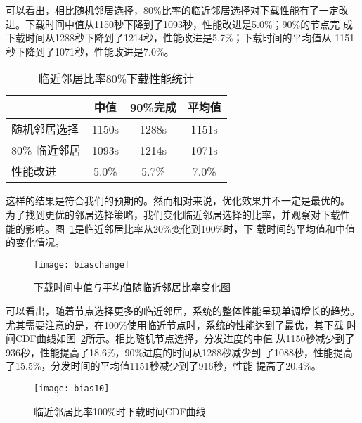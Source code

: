 可以看出，相比随机邻居选择，80\%比率的临近邻居选择对下载性能有了一定改
进。下载时间中值从1150秒下降到了1093秒，性能改进是5.0\%；90\%的节点完
成下载时间从1288秒下降到了1214秒，性能改进是5.7\%；下载时间的平均值从
1151秒下降到了1071秒，性能改进是7.0\%。

\begin{table}[htbp]
\centering
\begin{minipage}{0.6\linewidth}
\centering
\caption{临近邻居比率80\%下载性能统计}
\label{tbl:bias80}
\begin{tabular}{lccc}

\toprule[1.5pt]
    & 中值 & 90\%完成 & 平均值\\
\midrule[1pt]
随机邻居选择  & 1150s & 1288s & 1151s\\
80\% 临近邻居 & 1093s & 1214s & 1071s\\
性能改进      & 5.0\% & 5.7\% & 7.0\%\\
\bottomrule[1.5pt]
\end{tabular}
\end{minipage}
\end{table}

这样的结果是符合我们的预期的。然而相对来说，优化效果并不一定是最优的。
为了找到更优的邻居选择策略，我们变化临近邻居选择的比率，并观察对下载性
能的影响。图~\ref{fig:biaschange}是临近邻居比率从20\%变化到100\%时，下
载时间的平均值和中值的变化情况。

\begin{figure}[htb]
  \centering
  \begin{minipage}{0.6\linewidth}
    \centering
    \texttt{[image: biaschange]}
    \caption{下载时间中值与平均值随临近邻居比率变化图}
    \label{fig:biaschange}
  \end{minipage}
\end{figure}

可以看出，随着节点选择更多的临近邻居，系统的整体性能呈现单调增长的趋势。
尤其需要注意的是，在100\%使用临近节点时，系统的性能达到了最优，其下载
时间CDF曲线如图~\ref{fig:bias10}所示。相比随机节点选择，分发进度的中值
从1150秒减少到了936秒，性能提高了18.6\%，90\%进度的时间从1288秒减少到
了1088秒，性能提高了15.5\%，分发时间的平均值1151秒减少到了916秒，性能
提高了20.4\%。

\begin{figure}[htb]
  \centering
  \begin{minipage}{0.6\linewidth}
    \centering
    \texttt{[image: bias10]}
    \caption{临近邻居比率100\%时下载时间CDF曲线}
    \label{fig:bias10}
  \end{minipage}
\end{figure}

